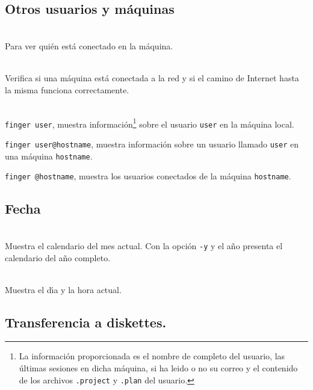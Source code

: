 \subsection{Otros usuarios y m\'aquinas}

\noindent
{}  \\
Para ver  qui{\'e}n est{\'a} conectado en la m{\'a}quina.

\vspace{.5cm}

\noindent
{}\\[1mm]
Verifica si una m{\'a}quina est{\'a} conectada a la red y si el camino de Internet
hasta la misma funciona correctamente.

\vspace{.5cm}

\noindent
{}\\
\verb+finger user+, muestra informaci{\'o}n\footnote{La informaci{\'o}n
  proporcionada es el nombre de completo del usuario, las {\'u}ltimas
  sesiones en dicha m{\'a}quina, si ha leido o no su correo y el contenido
  de los archivos {\tt .project} y {\tt .plan} del usuario.} sobre el
usuario \verb+user+ en la m{\'a}quina local.

\noindent
\verb+finger user@hostname+, muestra informaci{\'o}n sobre un usuario
llamado \verb+user+ en una m{\'a}quina \verb+hostname+. 

\noindent
\verb+finger @hostname+, muestra los usuarios conectados de la m{\'a}quina
\verb+hostname+.

\subsection{Fecha}

\noindent
{}\\
Muestra el calendario del mes actual. Con la opci{\'o}n \verb=-y= y el a{\~n}o
presenta el calendario del a{\~n}o completo.

\vspace{.5cm}

\noindent
{}\\
Muestra el d{\'\i}a y la hora actual.


\subsection{Transferencia a diskettes.}

